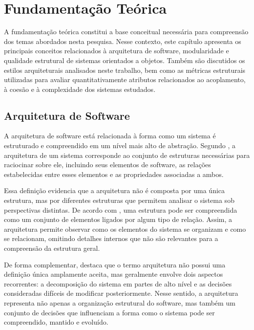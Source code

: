 \chapter{Fundamentação Teórica}
\label{cap:fundamentacao-teorica}

A fundamentação teórica constitui a base conceitual necessária para compreensão dos temas abordados nesta pesquisa. Nesse contexto, este 
capítulo apresenta os principais conceitos relacionados à arquitetura de software, modularidade e qualidade estrutural de sistemas orientados
a objetos. Também são discutidos os estilos arquiteturais analisados neste trabalho, bem como as métricas estruturais utilizadas para avaliar 
quantitativamente atributos relacionados ao acoplamento, à coesão e à complexidade dos sistemas estudados.

\section{Arquitetura de Software}
\label{sec:arquitetura-de-software}

A arquitetura de software está relacionada à forma como um sistema é estruturado e compreendido em um nível mais alto de abstração. 
Segundo , a arquitetura de um sistema corresponde ao conjunto de estruturas necessárias para raciocinar sobre ele, 
incluindo seus elementos de software, as relações estabelecidas entre esses elementos e as propriedades associadas a ambos.

Essa definição evidencia que a arquitetura não é composta por uma única estrutura, mas por diferentes estruturas que permitem analisar 
o sistema sob perspectivas distintas. De acordo com , uma estrutura pode ser compreendida como um conjunto de 
elementos ligados por algum tipo de relação. Assim, a arquitetura permite observar como os elementos do sistema se organizam e como 
se relacionam, omitindo detalhes internos que não são relevantes para a compreensão da estrutura geral.

De forma complementar,  destaca que o termo arquitetura não possui uma definição única amplamente aceita, 
mas geralmente envolve dois aspectos recorrentes: a decomposição do sistema em partes de alto nível e as decisões consideradas 
difíceis de modificar posteriormente. Nesse sentido, a arquitetura representa não apenas a organização estrutural do software, 
mas também um conjunto de decisões que influenciam a forma como o sistema pode ser compreendido, mantido e evoluído.

